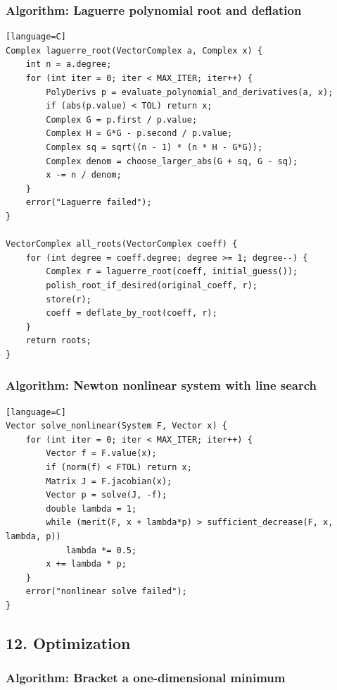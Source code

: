 \documentclass[11pt]{article}
\begin{document}
\subsubsection{Algorithm: Laguerre polynomial root and deflation}\label{algorithm-laguerre-polynomial-root-and-deflation}

\begin{verbatim}[language=C]
Complex laguerre_root(VectorComplex a, Complex x) {
    int n = a.degree;
    for (int iter = 0; iter < MAX_ITER; iter++) {
        PolyDerivs p = evaluate_polynomial_and_derivatives(a, x);
        if (abs(p.value) < TOL) return x;
        Complex G = p.first / p.value;
        Complex H = G*G - p.second / p.value;
        Complex sq = sqrt((n - 1) * (n * H - G*G));
        Complex denom = choose_larger_abs(G + sq, G - sq);
        x -= n / denom;
    }
    error("Laguerre failed");
}

VectorComplex all_roots(VectorComplex coeff) {
    for (int degree = coeff.degree; degree >= 1; degree--) {
        Complex r = laguerre_root(coeff, initial_guess());
        polish_root_if_desired(original_coeff, r);
        store(r);
        coeff = deflate_by_root(coeff, r);
    }
    return roots;
}
\end{verbatim}

\subsubsection{Algorithm: Newton nonlinear system with line search}\label{algorithm-newton-nonlinear-system-with-line-search}

\begin{verbatim}[language=C]
Vector solve_nonlinear(System F, Vector x) {
    for (int iter = 0; iter < MAX_ITER; iter++) {
        Vector f = F.value(x);
        if (norm(f) < FTOL) return x;
        Matrix J = F.jacobian(x);
        Vector p = solve(J, -f);
        double lambda = 1;
        while (merit(F, x + lambda*p) > sufficient_decrease(F, x, lambda, p))
            lambda *= 0.5;
        x += lambda * p;
    }
    error("nonlinear solve failed");
}
\end{verbatim}

\subsection{12. Optimization}\label{optimization}

\subsubsection{Algorithm: Bracket a one-dimensional minimum}\label{algorithm-bracket-a-one-dimensional-minimum}
\end{document}
